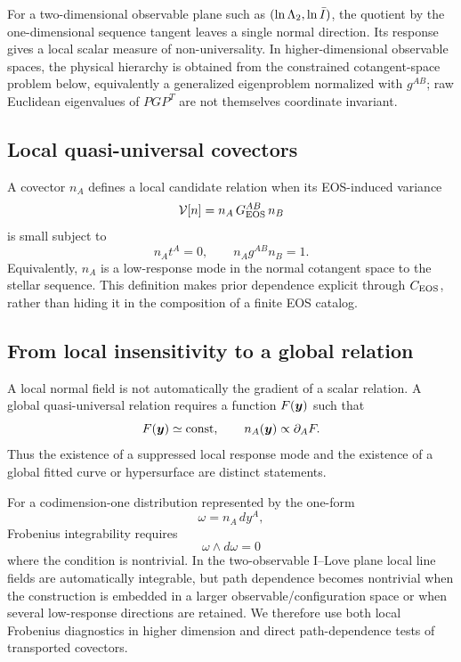 For a two-dimensional observable plane such as \((\ln\Lambda_2,\ln\bar I)\), the quotient by the one-dimensional sequence tangent leaves a single normal direction. Its response gives a local scalar measure of non-universality. In higher-dimensional observable spaces, the physical hierarchy is obtained from the constrained cotangent-space problem below, equivalently a generalized eigenproblem normalized with \(g^{AB}\); raw Euclidean eigenvalues of \(P G P^T\) are not themselves coordinate invariant.

\subsection{Local quasi-universal covectors}

A covector \(n_A\) defines a local candidate relation when its EOS-induced variance
\begin{equation}
    \mathcal V[n]
    =
    n_A\,G_{\rm EOS}^{AB}\,n_B
    \label{eq:variance-functional}
\end{equation}
is small subject to
\begin{equation}
    n_A t^A=0,
    \qquad
    n_A g^{AB}n_B=1 .
    \label{eq:normalization}
\end{equation}
Equivalently, \(n_A\) is a low-response mode in the normal cotangent space to the stellar sequence. This definition makes prior dependence explicit through \(C_{\rm EOS}\), rather than hiding it in the composition of a finite EOS catalog.

\subsection{From local insensitivity to a global relation}
\label{sec:integrability}

A local normal field is not automatically the gradient of a scalar relation. A global quasi-universal relation requires a function \(F(\bm{y})\) such that
\begin{equation}
    F(\bm{y})\simeq {\rm const},
    \qquad
    n_A(\bm{y})\propto\partial_A F .
    \label{eq:global-relation}
\end{equation}
Thus the existence of a suppressed local response mode and the existence of a global fitted curve or hypersurface are distinct statements.

For a codimension-one distribution represented by the one-form
\begin{equation}
    \omega=n_A\,dy^A,
\end{equation}
Frobenius integrability requires
\begin{equation}
    \omega\wedge d\omega=0
    \label{eq:frobenius}
\end{equation}
where the condition is nontrivial. In the two-observable I--Love plane local line fields are automatically integrable, but path dependence becomes nontrivial when the construction is embedded in a larger observable/configuration space or when several low-response directions are retained. We therefore use both local Frobenius diagnostics in higher dimension and direct path-dependence tests of transported covectors.

